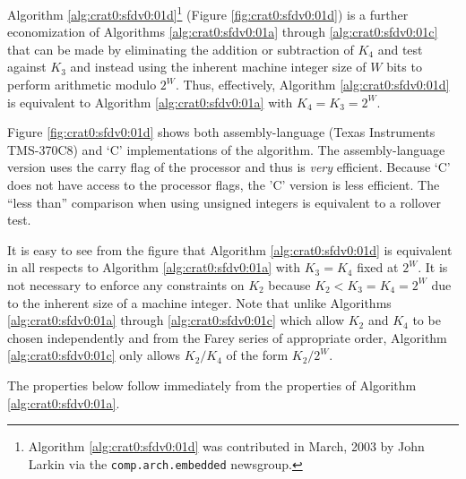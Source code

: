 Algorithm \ref{alg:crat0:sfdv0:01d}\footnote{Algorithm \ref{alg:crat0:sfdv0:01d} 
was contributed in March, 2003
by John Larkin \cite{bibref:i:johnlarkin}
via the
\texttt{comp.arch.embedded} \cite{bibref:n:comparchembedded} 
newsgroup.}
(Figure \ref{fig:crat0:sfdv0:01d}) is a further
economization of Algorithms \ref{alg:crat0:sfdv0:01a}
through \ref{alg:crat0:sfdv0:01c} that can be made by eliminating 
the addition or subtraction of $K_4$ and test against $K_3$ 
and instead using the
inherent machine integer size of $W$ bits to perform
arithmetic modulo $2^W$.  Thus, effectively, Algorithm \ref{alg:crat0:sfdv0:01d} 
is equivalent to Algorithm \ref{alg:crat0:sfdv0:01a} with
$K_4 = K_3 = 2^W$.

Figure \ref{fig:crat0:sfdv0:01d} shows both
assembly-language (Texas Instruments TMS-370C8) and
`C' implementations of the algorithm.  The assembly-language
version uses the carry flag of the processor and thus
is \emph{very} efficient.  Because `C' does not have access
to the processor flags, the 'C' version is less efficient.
The ``less than'' comparison when
using unsigned integers is equivalent to a rollover test.

It is easy to see from the figure that Algorithm \ref{alg:crat0:sfdv0:01d} 
is equivalent in all
respects to Algorithm \ref{alg:crat0:sfdv0:01a} with
$K_3 = K_4$ fixed at $2^W$.  It is not necessary to enforce any constraints
on $K_2$ because $K_2 < K_3 = K_4 = 2^W$ due to the inherent size of
a machine integer.  Note that unlike Algorithms \ref{alg:crat0:sfdv0:01a} 
through \ref{alg:crat0:sfdv0:01c} which allow $K_2$ and $K_4$ to be chosen independently
and from the Farey series of appropriate order, Algorithm \ref{alg:crat0:sfdv0:01c} 
only allows
$K_2/K_4$ of the form $K_2/2^W$.

The properties below follow immediately
from the properties of Algorithm \ref{alg:crat0:sfdv0:01a}.


